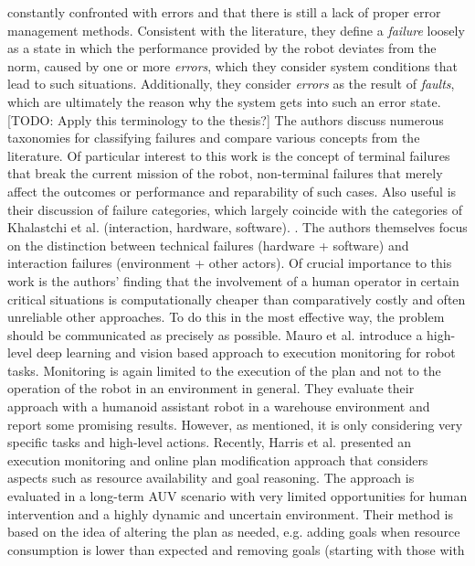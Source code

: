 \documentclass[english, master, utf8]{base/thesis_KBS}
\begin{document}
constantly confronted with errors and that there is still a lack of proper error management methods. Consistent with the literature, they define a \textit{failure} loosely as a
state in which the performance provided by the robot deviates from the norm, caused by one or more \textit{errors}, which they consider system conditions that lead to such
situations. Additionally, they consider \textit{errors} as the result of \textit{faults}, which are ultimately the reason why the system gets into such an error state.
[TODO: Apply this terminology to the thesis?] The authors discuss numerous taxonomies for classifying failures and compare various concepts from the literature. Of particular
interest to this work is the concept of terminal failures that break the current mission of the robot, non-terminal failures that merely affect the outcomes or performance and
reparability of such cases. Also useful is their discussion of failure categories, which largely coincide with the categories of Khalastchi et al. (interaction, hardware, software).
\cite{Khalastchi:2018}. The authors themselves focus on the distinction between technical failures (hardware + software) and interaction failures (environment + other actors).
Of crucial importance to this work is the authors' finding that the involvement of a human operator in certain critical situations is computationally cheaper than comparatively
costly and often unreliable other approaches. To do this in the most effective way, the problem should be communicated as precisely as possible. \cite{Honig:2018}\newline
Mauro et al. \cite{Mauro:2019} introduce a high-level deep learning and vision based approach to execution monitoring for robot tasks. Monitoring is again limited to the execution of the
plan and not to the operation of the robot in an environment in general. They evaluate their approach with a humanoid assistant robot in a warehouse environment and report some
promising results. However, as mentioned, it is only considering very specific tasks and high-level actions.\newline
Recently, Harris et al. \cite{Harris:2021} presented an execution monitoring and online plan modification approach that considers aspects such as resource availability
and goal reasoning. The approach is evaluated in a long-term AUV scenario with very limited opportunities for human intervention and a highly dynamic and uncertain environment.
Their method is based on the idea of altering the plan as needed, e.g. adding goals when resource consumption is lower than expected and removing goals (starting with those with
\end{document}
